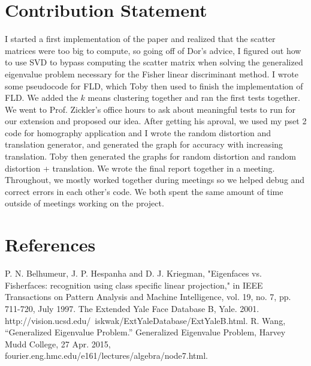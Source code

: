 \documentclass{amsart}
\theoremstyle{definition}
\theoremstyle{remark}
\begin{document}
\section{Contribution Statement}
I started a first implementation of the paper and realized that the scatter matrices were too big to compute, so going off of Dor's advice, I figured out how to use SVD to bypass computing the scatter matrix when solving the generalized eigenvalue problem necessary for the Fisher linear discriminant method. I wrote some pseudocode for FLD, which Toby then used to finish the implementation of FLD. We added the $k$ means clustering together and ran the first tests together. We went to Prof. Zickler's office hours to ask about meaningful tests to run for our extension and proposed our idea. After getting his aproval, we used my pset 2 code for homography application and I wrote the random distortion and translation generator, and generated the graph for accuracy with increasing translation. Toby then generated the graphs for random distortion and random distortion + translation. We wrote the final report together in a meeting. Throughout, we mostly worked together during meetings so we helped debug and correct errors in each other's code. We both spent the same amount of time outside of meetings working on the project. 

\section{References}
\noindent P. N. Belhumeur, J. P. Hespanha and D. J. Kriegman, "Eigenfaces vs. Fisherfaces: recognition using class specific linear projection," in IEEE Transactions on Pattern Analysis and Machine Intelligence, vol. 19, no. 7, pp. 711-720, July 1997.
\linebreak
\linebreak
The Extended Yale Face Database B, Yale. 2001. http://vision.ucsd.edu/~iskwak/ExtYaleDatabase/ExtYaleB.html.
\linebreak
\linebreak
R. Wang, “Generalized Eigenvalue Problem.” Generalized Eigenvalue Problem, Harvey Mudd College, 27 Apr. 2015, fourier.eng.hmc.edu/e161/lectures/algebra/node7.html.
\end{document}
